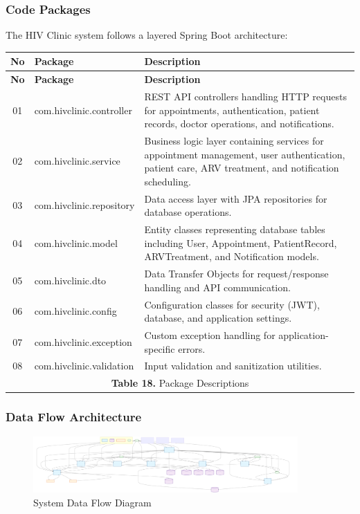 \documentclass[12pt,a4paper]{article}
\begin{document}
\subsubsection{Code Packages}

The HIV Clinic system follows a layered Spring Boot architecture:
\renewcommand{\arraystretch}{1.4}
\begin{longtable}{|c|p{6cm}|p{8cm}|}
\hline
\textbf{No} & \textbf{Package} & \textbf{Description} \\
\hline
\endfirsthead

\hline
\textbf{No} & \textbf{Package} & \textbf{Description} \\
\hline
\endhead

01 & com.hivclinic.controller & REST API controllers handling HTTP requests for appointments, authentication, patient records, doctor operations, and notifications. \\
\hline
02 & com.hivclinic.service & Business logic layer containing services for appointment management, user authentication, patient care, ARV treatment, and notification scheduling. \\
\hline
03 & com.hivclinic.repository & Data access layer with JPA repositories for database operations. \\
\hline
04 & com.hivclinic.model & Entity classes representing database tables including User, Appointment, PatientRecord, ARVTreatment, and Notification models. \\
\hline
05 & com.hivclinic.dto & Data Transfer Objects for request/response handling and API communication. \\
\hline
06 & com.hivclinic.config & Configuration classes for security (JWT), database, and application settings. \\
\hline
07 & com.hivclinic.exception & Custom exception handling for application-specific errors. \\
\hline
08 & com.hivclinic.validation & Input validation and sanitization utilities. \\
\hline
\multicolumn{3}{|c|}{\textbf{Table 18.} Package Descriptions} \\
\hline
\end{longtable}

\subsubsection{Data Flow Architecture}

\begin{figure}[H]
\centering
\includegraphics[width=0.9\textwidth]{diagrams/data_flow_diagram.svg}
\caption{System Data Flow Diagram}
\label{fig:data-flow-diagram}
\end{figure}
\end{document}

